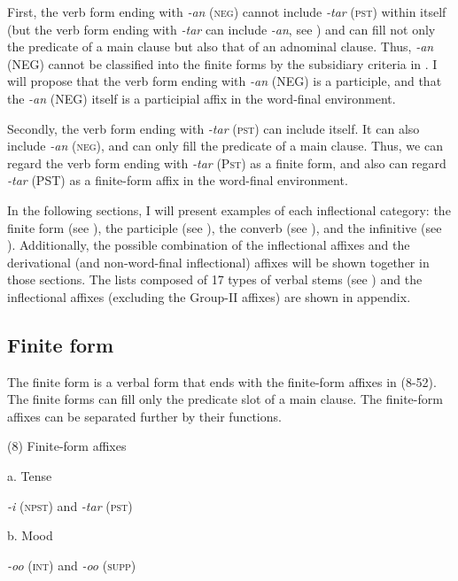 First, the verb form ending with \textit{{}-an} (\textsc{neg}) cannot include \textit{{}-tar} (\textsc{pst}) within itself (but the verb form ending with \textit{{}-tar} can include \textit{{}-an}, see ) and can fill not only the predicate of a main clause but also that of an adnominal clause. Thus, \textit{{}-an} (NEG) cannot be classified into the finite forms by the subsidiary criteria in . I will propose that the verb form ending with \textit{-an} (NEG) is a participle, and that the \textit{{}-an} (NEG) itself is a participial affix in the word-final environment.

Secondly, the verb form ending with \textit{{}-tar} (\textsc{pst}) can include itself. It can also include \textit{{}-an} (\textsc{neg}), and can only fill the predicate of a main clause. Thus, we can regard the verb form ending with \textit{{}-tar} (P\textsc{st}) as a finite form, and also can regard \textit{{}-tar} (PST) as a finite-form affix in the word-final environment.

In the following sections, I will present examples of each inflectional category: the finite form (see ), the participle (see ), the converb (see ), and the infinitive (see ). Additionally, the possible combination of the inflectional affixes and the derivational (and non-word-final inflectional) affixes will be shown together in those sections. The lists composed of 17 types of verbal stems (see ) and the inflectional affixes (excluding the Group-II affixes) are shown in appendix.

\subsection{Finite form}

The finite form is a verbal form that ends with the finite-form affixes in (8-52). The finite forms can fill only the predicate slot of a main clause. The finite-form affixes can be separated further by their functions.

(8)  Finite-form affixes

  a.  Tense

    \textit{{}-i} (\textsc{npst}) and \textit{{}-tar} (\textsc{pst})

  b.  Mood

    \textit{{}-oo} (\textsc{int}) and \textit{-oo} (\textsc{supp})

